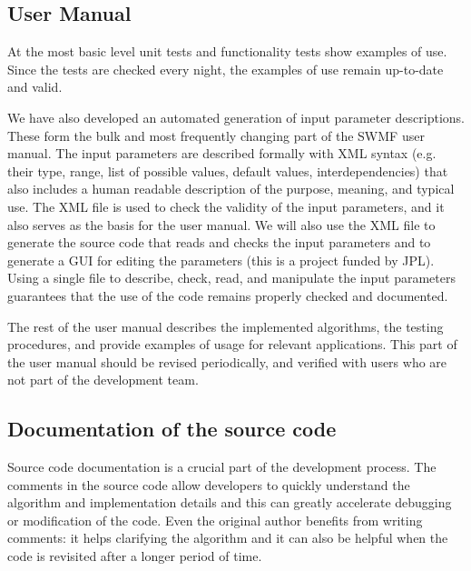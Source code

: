 \documentclass{article}
\begin{document}
\subsection{User Manual}

At the most basic level unit tests and functionality tests show examples of 
use. Since the tests are checked every night, the examples of use remain 
up-to-date and valid. 

We have also developed an automated generation of input parameter descriptions.
These form the bulk and most frequently changing part of the SWMF user manual.
The input parameters are described formally with XML syntax (e.g. their 
type, range, list of possible values, default values, interdependencies) 
that also includes a human readable description of the purpose, meaning,
and typical use. The XML file is used to check the validity of the input
parameters, and it also serves as the basis for the user manual. 
We will also use the XML file to generate the source code that reads and
checks the input parameters and to generate a GUI for editing the 
parameters (this is a project funded by JPL). 
Using a single file to describe, check, read, and manipulate the input 
parameters guarantees that the use of the code remains properly checked and 
documented.

The rest of the user manual describes the implemented algorithms,
the testing procedures, and provide examples of usage for relevant 
applications. This part of the user manual should be revised periodically,
and verified with users who are not part of the development team.

\subsection{Documentation of the source code}

Source code documentation is a crucial part of the development process. 
The comments in the source code allow developers to quickly understand
the algorithm and implementation details and this can greatly accelerate
debugging or modification of the code. Even the original author benefits from
writing comments: it helps clarifying the algorithm and it can also be helpful
when the code is revisited after a longer period of time.
\end{document}
